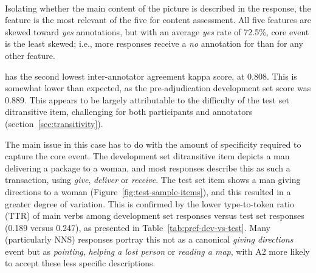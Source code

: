\paragraph{} Isolating whether the main content of the picture is described in the response, the  feature is the most relevant of the five for content assessment. All five features are skewed toward \textit{yes} annotations, but with an average \textit{yes} rate of 72.5\%, core event is the least skewed; i.e., more responses receive a \textit{no} annotation for  than for any other feature.

 has the second lowest inter-annotator agreement kappa score, at 0.808. This is somewhat lower than expected, as the pre-adjudication development set score was 0.889. This appears to be largely attributable to the difficulty of the test set ditransitive item, challenging for both participants and annotators (section~\ref{sec:transitivity}). 

The main issue in this case has to do with the amount of specificity required to capture the core event.  The development set ditransitive item depicts a man delivering a package to a woman, and most responses describe this as such a transaction, using \textit{give}, \textit{deliver} or \textit{receive}. The test set item shows a man giving directions to a woman (Figure~\ref{fig:test-sample-items}), and this resulted in a greater degree of variation. This is confirmed by the lower type-to-token ratio  (TTR) of main verbs among development set responses versus test set responses (0.189 versus 0.247), as presented in Table~\ref{tab:pref-dev-vs-test}. Many  (particularly NNS) responses portray this not as a canonical \textit{giving directions} event but as \textit{pointing}, 
\textit{helping a lost person} or \textit{reading a map}, with A2 more likely to accept these less specific descriptions.

